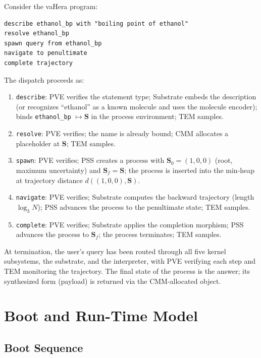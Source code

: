 \documentclass[11pt,twocolumn,a4paper]{article}
\newcommand{\Scoord}{\mathbf{S}}
\begin{document}
Consider the vaHera program:
\begin{center}
\begin{minipage}{0.9\columnwidth}
\begin{lstlisting}[style=vaheralst]
describe ethanol_bp with "boiling point of ethanol"
resolve ethanol_bp
spawn query from ethanol_bp
navigate to penultimate
complete trajectory
\end{lstlisting}
\end{minipage}
\end{center}

The dispatch proceeds as:

\begin{enumerate}[leftmargin=*]
\item \texttt{describe}: PVE verifies the statement type; Substrate embeds the description (or recognizes ``ethanol'' as a known molecule and uses the molecule encoder); binds \texttt{ethanol\_bp} $\mapsto \Scoord$ in the process environment; TEM samples.
\item \texttt{resolve}: PVE verifies; the name is already bound; CMM allocates a placeholder at $\Scoord$; TEM samples.
\item \texttt{spawn}: PVE verifies; PSS creates a process with $\Scoord_0 = (1,0,0)$ (root, maximum uncertainty) and $\Scoord_f = \Scoord$; the process is inserted into the min-heap at trajectory distance $d((1,0,0), \Scoord)$.
\item \texttt{navigate}: PVE verifies; Substrate computes the backward trajectory (length $\log_3 N$); PSS advances the process to the penultimate state; TEM samples.
\item \texttt{complete}: PVE verifies; Substrate applies the completion morphism; PSS advances the process to $\Scoord_f$; the process terminates; TEM samples.
\end{enumerate}

At termination, the user's query has been routed through all five kernel subsystems, the substrate, and the interpreter, with PVE verifying each step and TEM monitoring the trajectory. The final state of the process is the answer; its synthesized form (payload) is returned via the CMM-allocated object.


\section{Boot and Run-Time Model}
\label{sec:boot}

\subsection{Boot Sequence}
\end{document}
